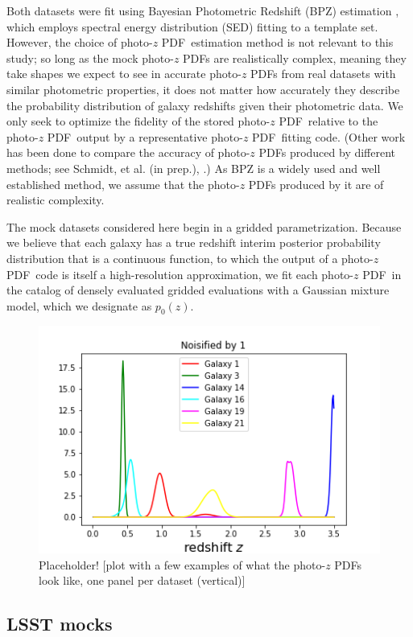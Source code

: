 \documentclass[\docopts]{\docclass}
\newcommand{\pz}{photo-$z$ PDF}
\begin{document}
Both datasets were fit using Bayesian Photometric Redshift (BPZ) estimation 
\citep{benitez_bayesian_2000}, which employs spectral energy distribution (SED) 
fitting to a template set.  However, the choice of \pz\ estimation method is 
not relevant to this study; so long as the mock \pz s are realistically 
complex, meaning they take shapes we expect to see in accurate \pz s from real 
datasets with similar photometric properties, it does not matter how accurately 
they describe the probability distribution of galaxy redshifts given their 
photometric data.  We only seek to optimize the fidelity of the stored \pz\ 
relative to the \pz\ output by a representative \pz\ fitting code.  (Other work 
has been done to compare the accuracy of \pz s produced by different methods; 
see Schmidt, et al. (in prep.), \citet{tanaka_photometric_2017}.)  As BPZ is a 
widely used and well established method, we assume that the \pz s produced by 
it are of realistic complexity.

The mock datasets considered here begin in a gridded parametrization.  Because 
we believe that each galaxy has a true redshift interim posterior probability 
distribution that is a continuous function, to which the output of a \pz\ code 
is itself a high-resolution approximation, we fit each \pz\ in the catalog of 
densely evaluated gridded evaluations with a Gaussian mixture model, which we 
designate as $p_{0}(z)$.

\begin{figure}
  \includegraphics[width=0.9\columnwidth]{figures/pz_placeholder.png}
  \caption{Placeholder! [plot with a few examples of what the \pz s look like, 
one panel per dataset (vertical)]
  \label{fig:pzs}}
\end{figure}

\subsection{LSST mocks}
\label{sec:ss}
\end{document}
